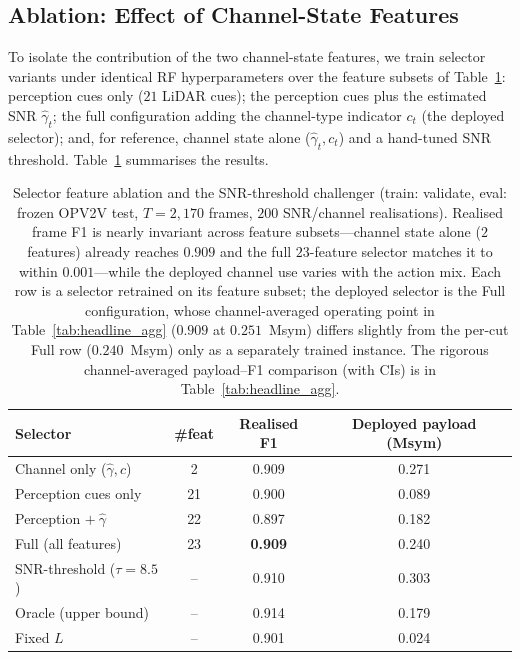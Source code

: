 \documentclass[journal]{IEEEtran}
\begin{document}
\subsection{Ablation: Effect of Channel-State Features}\label{sec:ablation}

To isolate the contribution of the two channel-state features, we train selector variants under identical RF hyperparameters over the feature subsets of Table~\ref{tab:ablation}: perception cues only ($21$ LiDAR cues); the perception cues plus the estimated SNR $\hat\gamma_t$; the full configuration adding the channel-type indicator $c_t$ (the deployed selector); and, for reference, channel state alone ($\hat\gamma_t,c_t$) and a hand-tuned SNR threshold. Table~\ref{tab:ablation} summarises the results.

\begin{table}[t]
\centering
\caption{Selector feature ablation and the SNR-threshold challenger (train: validate, eval: frozen OPV2V test, $T=2{,}170$ frames, $200$ SNR/channel realisations). Realised frame F1 is nearly invariant across feature subsets---channel state alone ($2$ features) already reaches $0.909$ and the full $23$-feature selector matches it to within $0.001$---while the deployed channel use varies with the action mix. Each row is a selector retrained on its feature subset; the deployed selector is the Full configuration, whose channel-averaged operating point in Table~\ref{tab:headline_agg} ($0.909$ at $0.251$~Msym) differs slightly from the per-cut Full row ($0.240$~Msym) only as a separately trained instance. The rigorous channel-averaged payload--F1 comparison (with CIs) is in Table~\ref{tab:headline_agg}.}
\label{tab:ablation}
\begin{tabular}{lccc}
\toprule
Selector & \#feat & Realised F1 & Deployed payload (Msym) \\
\midrule
Channel only ($\hat\gamma,c$)        & 2  & 0.909 & 0.271 \\
Perception cues only                 & 21 & 0.900 & 0.089 \\
Perception $+\ \hat\gamma$           & 22 & 0.897 & 0.182 \\
Full (all features)                  & 23 & \textbf{0.909} & 0.240 \\
SNR-threshold ($\tau{=}8.5$)         & -- & 0.910 & 0.303 \\
\midrule
Oracle (upper bound)                 & -- & 0.914 & 0.179 \\
Fixed $L$                            & -- & 0.901 & 0.024 \\
\bottomrule
\end{tabular}
\end{table}
\end{document}
